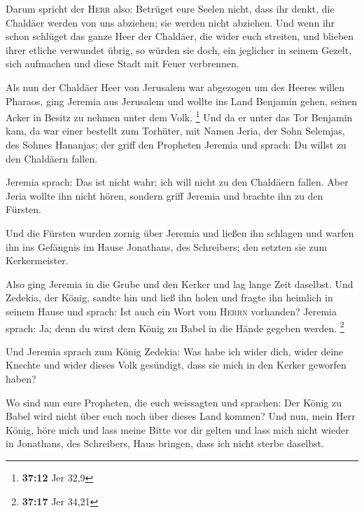  Darum spricht der \textsc{Herr} also: Betrüget eure
Seelen nicht, dass ihr denkt, die Chaldäer werden von uns abziehen; sie
werden nicht abziehen.  Und wenn ihr schon schlüget das
ganze Heer der Chaldäer, die wider euch streiten, und blieben ihrer
etliche verwundet übrig, so würden sie doch, ein jeglicher in seinem
Gezelt, sich aufmachen und diese Stadt mit Feuer verbrennen.

 Als nun der Chaldäer Heer von Jerusalem war abgezogen um
des Heeres willen Pharaos,  ging Jeremia aus Jerusalem
und wollte ins Land Benjamin gehen, seinen Acker in Besitz zu nehmen
unter dem Volk. \footnote{\textbf{37:12} Jer 32,9}  Und
da er unter das Tor Benjamin kam, da war einer bestellt zum Torhüter,
mit Namen Jeria, der Sohn Selemjas, des Sohnes Hananjas; der griff den
Propheten Jeremia und sprach: Du willst zu den Chaldäern fallen.

 Jeremia sprach: Das ist nicht wahr; ich will nicht zu
den Chaldäern fallen. Aber Jeria wollte ihn nicht hören, sondern griff
Jeremia und brachte ihn zu den Fürsten.

 Und die Fürsten wurden zornig über Jeremia und ließen
ihn schlagen und warfen ihn ins Gefängnis im Hause Jonathans, des
Schreibers; den setzten sie zum Kerkermeister.

 Also ging Jeremia in die Grube und den Kerker und lag
lange Zeit daselbst.  Und Zedekia, der König, sandte hin
und ließ ihn holen und fragte ihn heimlich in seinem Hause und sprach:
Ist auch ein Wort vom \textsc{Herrn} vorhanden? Jeremia sprach: Ja; denn
du wirst dem König zu Babel in die Hände gegeben werden. \footnote{\textbf{37:17}
  Jer 34,21}

 Und Jeremia sprach zum König Zedekia: Was habe ich wider
dich, wider deine Knechte und wider dieses Volk gesündigt, dass sie mich
in den Kerker geworfen haben?

 Wo sind nun eure Propheten, die euch weissagten und
sprachen: Der König zu Babel wird nicht über euch noch über dieses Land
kommen?  Und nun, mein Herr König, höre mich und lass
meine Bitte vor dir gelten und lass mich nicht wieder in Jonathans, des
Schreibers, Haus bringen, dass ich nicht sterbe daselbst.

